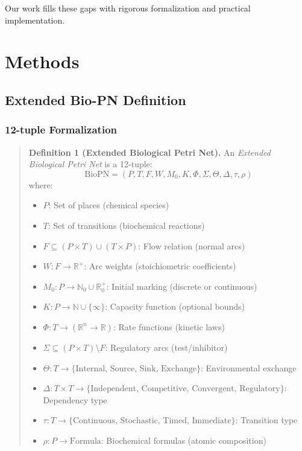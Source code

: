 \documentclass{article}
\begin{document}
Our work fills these gaps with rigorous formalization and practical implementation.

\section{Methods}

\subsection{Extended Bio-PN Definition}

\subsubsection{12-tuple Formalization}

\begin{quote}
\textbf{Definition 1 (Extended Biological Petri Net).}
An \emph{Extended Biological Petri Net} is a 12-tuple:
\begin{equation}
\text{BioPN} = (P, T, F, W, M_0, K, \Phi, \Sigma, \Theta, \Delta, \tau, \rho)
\end{equation}
where:
\begin{itemize}
    \item $P$: Set of places (chemical species)
    \item $T$: Set of transitions (biochemical reactions)
    \item $F \subseteq (P \times T) \cup (T \times P)$: Flow relation (normal arcs)
    \item $W: F \to \mathbb{R}^+$: Arc weights (stoichiometric coefficients)
    \item $M_0: P \to \mathbb{N}_0 \cup \mathbb{R}_0^+$: Initial marking (discrete or continuous)
    \item $K: P \to \mathbb{N} \cup \{\infty\}$: Capacity function (optional bounds)
    \item $\Phi: T \to (\mathbb{R}^n \to \mathbb{R})$: Rate functions (kinetic laws)
    \item $\Sigma \subseteq (P \times T) \setminus F$: Regulatory arcs (test/inhibitor)
    \item {\small $\Theta: T \to \{\text{Internal, Source, Sink, Exchange}\}$: Environmental exchange}
    \item {\small $\Delta: T \times T \to \{\text{Independent, Competitive, Convergent, Regulatory}\}$: Dependency type}
    \item {\small $\tau: T \to \{\text{Continuous, Stochastic, Timed, Immediate}\}$: Transition type}
    \item $\rho: P \to \text{Formula}$: Biochemical formulas (atomic composition)
\end{itemize}
\end{quote}
\end{document}
